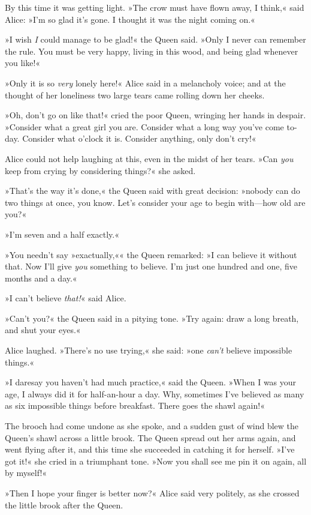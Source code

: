 By this time it was getting light. »The crow must have flown away, I think,« said Alice: »I'm so glad it's gone. I thought it was the night coming on.«

»I wish \textit{I} could manage to be glad!« the Queen said. »Only I never can remember the rule. You must be very happy, living in this wood, and being glad whenever you like!«

»Only it is so \textit{very} lonely here!« Alice said in a melancholy voice; and at the thought of her loneliness two large tears came rolling down her cheeks.

»Oh, don't go on like that!« cried the poor Queen, wringing her hands in despair. »Consider what a great girl you are. Consider what a long way you've come to-day. Consider what o'clock it is. Consider anything, only don't cry!«

Alice could not help laughing at this, even in the midst of her tears. »Can \textit{you} keep from crying by considering things?« she asked.

»That's the way it's done,« the Queen said with great decision: »nobody can do two things at once, you know. Let's consider your age to begin with—how old are you?«

»I'm seven and a half exactly.«

»You needn't say »exactually,«« the Queen remarked: »I can believe it without that. Now I'll give \textit{you} something to believe. I'm just one hundred and one, five months and a day.«

»I can't believe \textit{that!}« said Alice.

»Can't you?« the Queen said in a pitying tone. »Try again: draw a long breath, and shut your eyes.«

Alice laughed. »There's no use trying,« she said: »one \textit{can't} believe impossible things.«

»I daresay you haven't had much practice,« said the Queen. »When I was your age, I always did it for half-an-hour a day. Why, sometimes I've believed as many as six impossible things before breakfast. There goes the shawl again!«

The brooch had come undone as she spoke, and a sudden gust of wind blew the Queen's shawl across a little brook. The Queen spread out her arms again, and went flying after it, and this time she succeeded in catching it for herself. »I've got it!« she cried in a triumphant tone. »Now you shall see me pin it on again, all by myself!«

»Then I hope your finger is better now?« Alice said very politely, as she crossed the little brook after the Queen.

